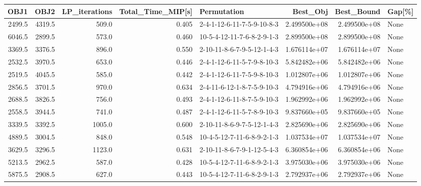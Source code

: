\begin{tabular}{rrrrlrrl}
\toprule
   OBJ1 &    OBJ2 &  LP\_iterations &  Total\_Time\_MIP[s] &                 Permutation &      Best\_Obj &    Best\_Bound & Gap[\%] \\
\midrule
 2499.5 &  4319.5 &          509.0 &              0.405 &  2-4-1-12-6-11-7-5-9-10-8-3 &  2.499500e+08 &  2.499500e+08 &   None \\
 6046.5 &  2899.5 &          573.0 &              0.460 &  10-5-4-12-11-7-6-8-2-9-1-3 &  2.899500e+08 &  2.899500e+08 &   None \\
 3369.5 &  3376.5 &          896.0 &              0.550 &  2-10-11-8-6-7-9-5-12-1-4-3 &  1.676114e+07 &  1.676114e+07 &   None \\
 2532.5 &  3970.5 &          653.0 &              0.446 &  2-4-1-12-6-11-5-7-9-8-10-3 &  5.842482e+06 &  5.842482e+06 &   None \\
 2519.5 &  4045.5 &          585.0 &              0.442 &  2-4-1-12-6-11-7-5-9-8-10-3 &  1.012807e+06 &  1.012807e+06 &   None \\
 2856.5 &  3701.5 &          970.0 &              0.634 &  2-4-11-6-12-1-8-7-5-9-10-3 &  4.794916e+06 &  4.794916e+06 &   None \\
 2688.5 &  3826.5 &          756.0 &              0.493 &  2-4-1-12-6-11-8-7-5-9-10-3 &  1.962992e+06 &  1.962992e+06 &   None \\
 2558.5 &  3944.5 &          741.0 &              0.487 &  2-4-1-12-6-11-5-7-8-9-10-3 &  9.837660e+05 &  9.837660e+05 &   None \\
 3339.5 &  3392.5 &         1005.0 &              0.600 &  2-10-11-8-6-9-7-5-12-1-4-3 &  2.825690e+06 &  2.825690e+06 &   None \\
 4889.5 &  3004.5 &          848.0 &              0.548 &  10-4-5-12-7-11-6-8-9-2-1-3 &  1.037534e+07 &  1.037534e+07 &   None \\
 3629.5 &  3296.5 &         1123.0 &              0.631 &  2-10-11-8-6-7-9-1-12-5-4-3 &  6.360854e+06 &  6.360854e+06 &   None \\
 5213.5 &  2962.5 &          587.0 &              0.428 &  10-5-4-12-7-11-6-8-9-2-1-3 &  3.975030e+06 &  3.975030e+06 &   None \\
 5875.5 &  2908.5 &          627.0 &              0.443 &  10-5-4-12-7-11-6-8-2-9-1-3 &  2.792937e+06 &  2.792937e+06 &   None \\
\bottomrule
\end{tabular}
